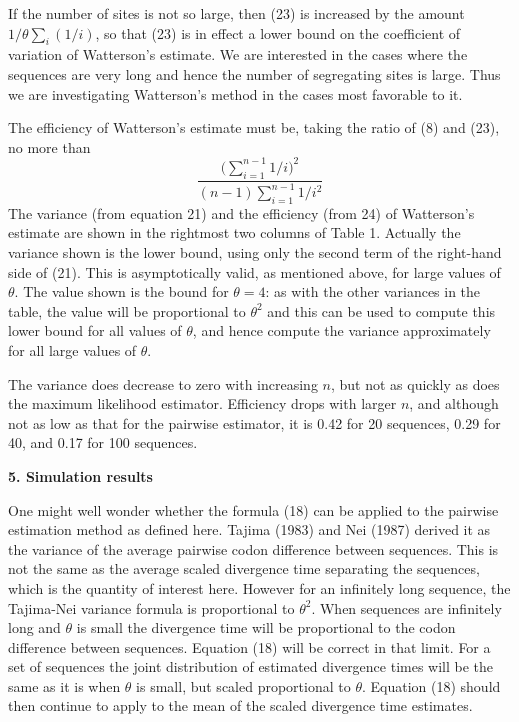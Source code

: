 If the number of sites is not so large, then (23) is increased by the amount
$1/\theta\sum_i (1/i)$, so that (23) is in effect a lower bound on the coefficient
of variation of Watterson's estimate.  We are interested in the cases where
the sequences are very long and hence the number of segregating sites is large.
Thus we are investigating Watterson's method in the cases most favorable to it.

The efficiency of Watterson's estimate must be, taking the ratio of (8) and (23),
no more than
\begin{equation} %
\frac{\bigl(\sum_{i=1}^{n-1} 1/i\bigr)^2} {(n-1) \sum_{i=1}^{n-1} 1/i^2}
\end{equation}
The variance (from equation 21) and the efficiency (from 24) of Watterson's
estimate are shown in the rightmost two columns of Table 1.  Actually the
variance shown is the lower bound, using only the second term of the right-hand
side of (21).  This is asymptotically valid, as mentioned above, for large
values of $\theta$.  The value shown is the bound for $\theta = 4$: as with the
other variances in the table, the value will be proportional to $\theta^2$
and this can be used to compute this lower bound for all values of $\theta$,
and hence compute the variance approximately for all large values of $\theta$.

The variance does decrease to zero with increasing $n$, but not as quickly
as does the maximum likelihood estimator.  Efficiency drops with larger $n$,
and although not as low as that for the pairwise estimator, it is
0.42 for 20 sequences, 0.29 for 40, and 0.17 for 100 sequences.


\bigskip

{\bf 5. Simulation results}

\medskip

One might well wonder whether the formula (18) can be applied to the
pairwise estimation method as defined here.  Tajima (1983) and Nei
(1987) derived it as the variance of the average pairwise codon
difference between sequences.  This is not the same as the average
scaled divergence time separating the sequences, which is the quantity of
interest here.  However for an infinitely long sequence, the Tajima-Nei variance
formula is proportional to $\theta^2$.  When sequences are infinitely
long and $\theta$ is small the divergence time will be proportional to the
codon difference between sequences.  Equation (18) will be correct in
that limit.  For a set of sequences the joint distribution of estimated
divergence times will be the same as it is when $\theta$ is small, but
scaled proportional to $\theta$.  Equation (18) should then continue to
apply to the mean of the scaled divergence time estimates.


